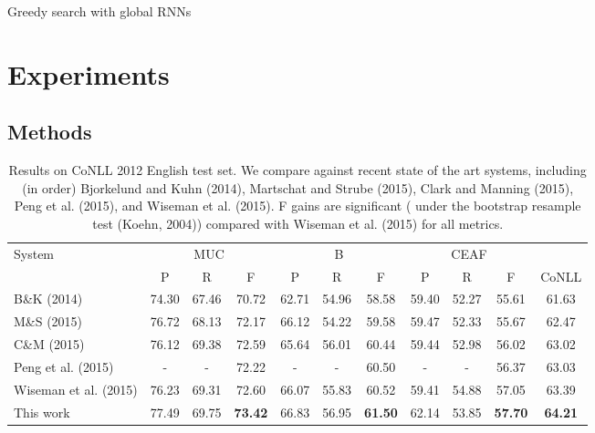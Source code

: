 \documentclass[11pt,letterpaper]{article}
\newcommand{\zro}{{\color{white}0}}
\begin{document}
\begin{algorithm}[t!]
  \footnotesize
  \begin{algorithmic}[1]
    \For{ }
    \State{}
    \State{}    
    \If{}
    \State{}
    \State{}
    \EndIf{}
    \State{ }
    \State{}
    \EndFor{}
    \State{\Return{}}
    \EndProcedure{}
  \end{algorithmic}
  \caption{\label{alg:greedy} Greedy search with global RNNs}
\end{algorithm}  
\section{Experiments}

\subsection{Methods}
\begin{table*}[htpb]
\small
\centering
\begin{tabular}{lcccccccccc}
\toprule 
\multirow{2}{*}{System} & \multicolumn{3}{c}{MUC} & \multicolumn{3}{c}{B}  & \multicolumn{3}{c}{CEAF} \\
 & P & R & F & P & R & F & P & R & F & CoNLL \\ 
\midrule 
B\&K (2014) & 74.3\zro & 67.46 & 70.72 & 62.71 & 54.96 & 58.58 & 59.4\zro & 52.27 & 55.61 & 61.63 \\
M\&S (2015) & 76.72 & 68.13 & 72.17 & 66.12 & 54.22 & 59.58 & 59.47 & 52.33 & 55.67 & 62.47 \\
C\&M (2015) & 76.12 & 69.38 & 72.59 & 65.64 & 56.01 & 60.44 & 59.44 & 52.98 & 56.02 & 63.02 \\
Peng et al. (2015) & - & - & 72.22 & - & - & 60.50 & - & - & 56.37 & 63.03 \\
Wiseman et al. (2015) & 76.23 & 69.31 & 72.60 & 66.07 & 55.83 & 60.52 & 59.41 & 54.88 & 57.05 &  63.39 \\
This work & 77.49 & 69.75 & \textbf{73.42} & 66.83 & 56.95 & \textbf{61.50} & 62.14 & 53.85 & \textbf{57.70} & \textbf{64.21} \\
\bottomrule 
\end{tabular} 
\caption{Results on CoNLL 2012 English test set. We compare against recent state of the art systems, including (in order) Bjorkelund and Kuhn (2014), Martschat and Strube (2015), Clark and Manning (2015), Peng et al. (2015), and Wiseman et al. (2015). F gains are significant ( under the bootstrap resample test (Koehn, 2004)) compared with Wiseman et al. (2015) for all metrics.
}
\label{tab:mainresults}
\end{table*}
\end{document}
